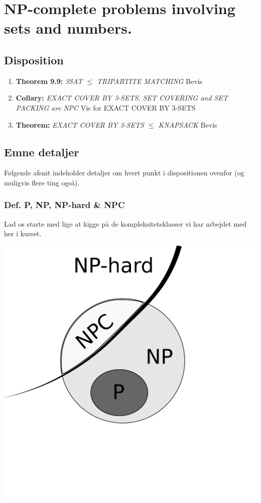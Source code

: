 \section{NP-complete problems involving sets and numbers.}

\subsection{Disposition}

\begin{enumerate}
 \item \textbf{Theorem 9.9:} \textit{3SAT $\leq$ TRIPARTITE MATCHING}
    \subitem Bevis
 \item \textbf{Collary:} \textit{EXACT COVER BY 3-SETS, SET COVERING and SET PACKING are NPC}
    \subitem Vis for EXACT COVER BY 3-SETS
 \item \textbf{Theorem:} \textit{EXACT COVER BY 3-SETS $\leq$ KNAPSACK}
    \subitem Bevis
\end{enumerate}

\subsection{Emne detaljer}

Følgende afsnit indeholder detaljer om hvert punkt i dispositionen ovenfor (og
muligvis flere ting også).

\subsubsection{Def. P, NP, NP-hard \& NPC}

Lad os starte med lige at kigge på de kompleksitetsklasser vi har arbejdet med
her i kurset.
\begin{center}
 \includegraphics[bb=0 0 400 400,scale=0.3]{img/PNPNPC.png}
\end{center}

